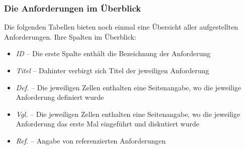 \documentclass[11pt]{article}
\begin{document}
%
% 
\newpage
\subsubsection{Die Anforderungen im Überblick}

Die folgenden Tabellen bieten noch einmal eine Übersicht aller aufgestellten Anforderungen. 
Ihre Spalten im Überblick:

\begin{itemize}
	\item \textit{ID} -- Die erste Spalte enthält die Bezeichnung der Anforderung
	
	\item \textit{Titel} -- Dahinter verbirgt sich Titel der jeweiligen Anforderung
	
	\item \textit{Def.} -- Die jeweiligen Zellen enthalten eine Seitenangabe, wo die jeweilige Anforderung definiert wurde
	
	\item \textit{Vgl.} -- Die jeweiligen Zellen enthalten eine Seitenangabe, wo die jeweilige Anforderung das erste Mal eingeführt und diskutiert wurde
	
	\item \textit{Ref.} -- Angabe von referenzierten Anforderungen
	
\end{itemize}
\end{document}
